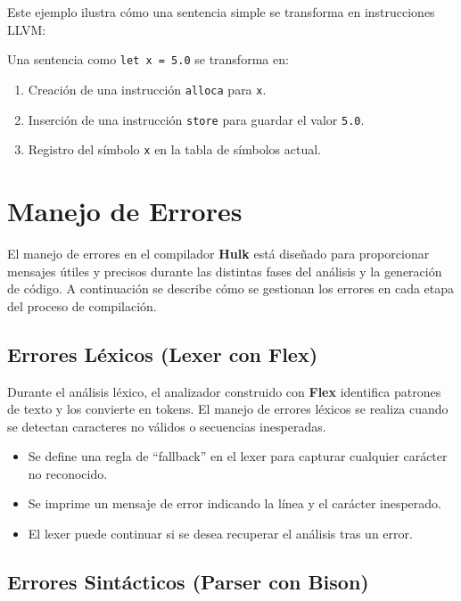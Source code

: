 \documentclass[11pt, a4paper, twoside]{article} %
\begin{document}
Este ejemplo ilustra cómo una sentencia simple se transforma en instrucciones LLVM:

Una sentencia como \texttt{let x = 5.0} se transforma en:

\begin{enumerate}
    \item Creación de una instrucción \texttt{alloca} para \texttt{x}.
    \item Inserción de una instrucción \texttt{store} para guardar el valor \texttt{5.0}.
    \item Registro del símbolo \texttt{x} en la tabla de símbolos actual.
\end{enumerate}

\section{Manejo de Errores}

El manejo de errores en el compilador \textbf{Hulk} está diseñado para proporcionar mensajes útiles y precisos durante las distintas fases del análisis y la generación de código. A continuación se describe cómo se gestionan los errores en cada etapa del proceso de compilación.

\subsection{Errores Léxicos (Lexer con Flex)}

Durante el análisis léxico, el analizador construido con \textbf{Flex} identifica patrones de texto y los convierte en tokens. El manejo de errores léxicos se realiza cuando se detectan caracteres no válidos o secuencias inesperadas.

\begin{itemize}
    \item Se define una regla de ``fallback'' en el lexer para capturar cualquier carácter no reconocido.
    \item Se imprime un mensaje de error indicando la línea y el carácter inesperado.
    \item El lexer puede continuar si se desea recuperar el análisis tras un error.
\end{itemize}

\subsection{Errores Sintácticos (Parser con Bison)}
\end{document}
